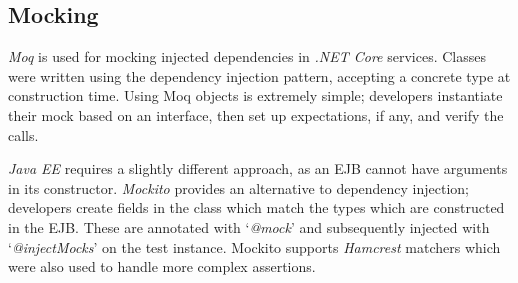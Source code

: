 \subsection{Mocking}
\par
\textit{Moq}\cite{Moq} is used for mocking injected dependencies in \textit{.NET Core} services. Classes were written using the dependency injection pattern, accepting a concrete type at construction time. Using Moq objects is extremely simple; developers instantiate their mock based on an interface, then set up expectations, if any, and verify the calls.

\par
\textit{Java EE} requires a slightly different approach, as an EJB cannot have arguments in its constructor. \textit{Mockito}\cite{Mockito} provides an alternative to dependency injection; developers create fields in the class which match the types which are constructed in the EJB. These are annotated with `\textit{@mock}' and subsequently injected with `\textit{@injectMocks}' on the test instance. Mockito supports \textit{Hamcrest}\cite{Hamcrest} matchers which were also used to handle more complex assertions.
